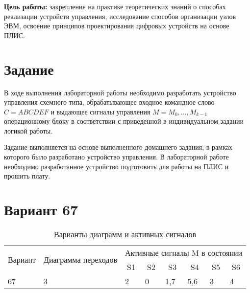 \documentclass[a4paper, 14pt]{article}
\begin{document}
    \graphicspath{{images/}{images2/}} %
    \renewcommand{\figurename}{Рисунок}

    \author{М.А.Гейне}
    \bmstutitlelab

    \textbf{Цель работы:} закрепление на практике теоретических знаний о способах
    реализации устройств управления, исследование способов организации узлов ЭВМ,
    освоение принципов проектирования цифровых устройств на основе ПЛИС.
    \section*{Задание}
    В ходе выполнения лабораторной работы необходимо разработать устройство
    управления схемного типа, обрабатывающее входное командное слово
    $ C ={ABCDEF}$ и выдающее сигналы управления $M={M_0,…,M_{k-1}}$
    операционному блоку в соответствии с приведенной в индивидуальном задании
    логикой работы.
    
    Задание выполняется на основе выполненного домашнего задания, в рамках которого было разработано устройство управления.
    В лабораторной работе необходимо разработанное устройство подготовить для работы на ПЛИС и прошить плату.

    \section*{Вариант 67}
    \begin{table}[H]
        \caption{Варианты диаграмм и активных сигналов}
        \begin{tabular}{|c|c|c|l|l|l|l|l|}
            \hline
            \multirow{2}{*}{Вариант} & \multirow{2}{*}{Диаграмма переходов} & \multicolumn{6}{c|}{Активные сигналы M в состоянии}                                                                                                      \\ \cline{3-8} 
                                     &                                      & S1                     & \multicolumn{1}{c|}{S2} & \multicolumn{1}{c|}{S3} & \multicolumn{1}{c|}{S4} & \multicolumn{1}{c|}{S5} & \multicolumn{1}{c|}{S6} \\ \hline
            \multicolumn{1}{|l|}{67} & \multicolumn{1}{l|}{3}               & \multicolumn{1}{l|}{2} & 0                       & 1,7                     & 5,6                     & 3                       & 4                       \\ \hline
        \end{tabular}
    \end{table}
\end{document}
